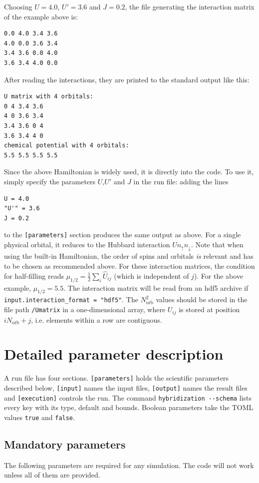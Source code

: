 \documentclass[aps,prb,floatfix,superscriptaddress,twocolumn,notitlepage]{revtex4-1}
\begin{document}
Choosing $U=4.0$, $U'=3.6$ and $J=0.2$, the file generating the interaction matrix of the example above is:
\begin{verbatim}
0.0 4.0 3.4 3.6
4.0 0.0 3.6 3.4
3.4 3.6 0.0 4.0
3.6 3.4 4.0 0.0 
\end{verbatim}
After reading the interactions, they are printed to the standard output like this:
\begin{verbatim}
U matrix with 4 orbitals: 
0 4 3.4 3.6 
4 0 3.6 3.4 
3.4 3.6 0 4 
3.6 3.4 4 0
chemical potential with 4 orbitals:
5.5 5.5 5.5 5.5
\end{verbatim}
Since the above Hamiltonian is widely used, it is directly into the code. To use it, simply specify the parameters $U$,$U'$ and $J$ in the run file: adding the lines
\begin{verbatim}
U = 4.0
"U'" = 3.6
J = 0.2
\end{verbatim}
to the \verb#[parameters]# section
produces the same output as above. For a single physical orbital, it reduces to the Hubbard interaction $Un_{\uparrow}n_{\downarrow}$.
Note that when using the built-in Hamiltonian, the order of spins and orbitals \emph{is} relevant and has to be chosen as recommended above.
For these interaction matrices, the condition for half-filling reads $\mu_{1/2}=\frac{1}{2}\sum_{i}\hat{U}_{ij}$ (which is independent of $j$). For the above example, $\mu_{1/2}=5.5$.
The interaction matrix will be read from an hdf5 archive if \verb#input.interaction_format = "hdf5"#. The $N_{\text{orb}}^{2}$ values should be stored in the file path \verb#/Umatrix# in a one-dimensional array, where $U_{ij}$ is stored at position $iN_{\text{orb}}+j$, i.e. elements within a row are contiguous.

\section{Detailed parameter description}

A run file has four sections. \verb#[parameters]# holds the scientific parameters described below, \verb#[input]# names the input files, \verb#[output]# names the result files and \verb#[execution]# controls the run. The command \verb#hybridization --schema# lists every key with its type, default and bounds. Boolean parameters take the TOML values \verb#true# and \verb#false#.

\subsection{Mandatory parameters}
The following parameters are required for any simulation. The code will not work unless all of them are provided.
\end{document}
